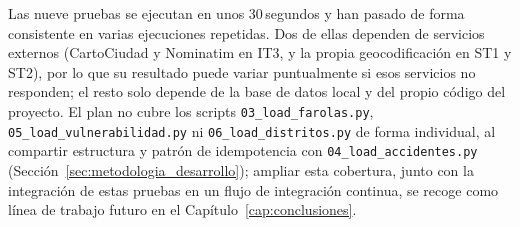 Las nueve pruebas se ejecutan en unos 30\,segundos y han pasado de forma consistente en varias ejecuciones repetidas. Dos de ellas dependen de servicios externos (CartoCiudad y Nominatim en IT3, y la propia geocodificación en ST1 y ST2), por lo que su resultado puede variar puntualmente si esos servicios no responden; el resto solo depende de la base de datos local y del propio código del proyecto. El plan no cubre los scripts \texttt{03\_load\_farolas.py}, \texttt{05\_load\_vulnerabilidad.py} ni \texttt{06\_load\_distritos.py} de forma individual, al compartir estructura y patrón de idempotencia con \texttt{04\_load\_accidentes.py} (Sección~\ref{sec:metodologia_desarrollo}); ampliar esta cobertura, junto con la integración de estas pruebas en un flujo de integración continua, se recoge como línea de trabajo futuro en el Capítulo~\ref{cap:conclusiones}.
